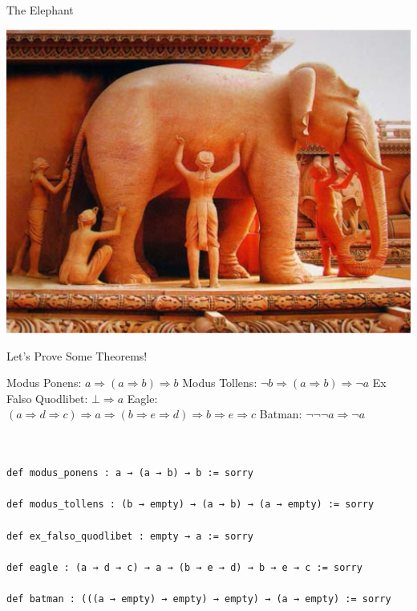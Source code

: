 \documentclass[pdf]{beamer}
\begin{document}
\begin{frame}{The Elephant}
  \begin{center}
    \includegraphics[scale=0.28]{images/elephant}
  \end{center}
\end{frame}

\begin{frame}[fragile]{Let's Prove Some Theorems!}
  \begin{outline}
    \1 Modus Ponens: $a \Rightarrow (a \Rightarrow b) \Rightarrow b$
    \1 Modus Tollens: $\neg{b} \Rightarrow (a \Rightarrow b) \Rightarrow \neg{a}$
    \1 Ex Falso Quodlibet: $\bot \Rightarrow a$
    \1 Eagle: $(a \Rightarrow d \Rightarrow c) \Rightarrow a \Rightarrow (b \Rightarrow e \Rightarrow d) \Rightarrow b \Rightarrow e \Rightarrow c$
    \1 Batman: $\neg{\neg{\neg{a}}} \Rightarrow \neg{a}$
    \pause
    \\~\
    \\~\
    \begin{verbatim}
def modus_ponens : a → (a → b) → b := sorry

def modus_tollens : (b → empty) → (a → b) → (a → empty) := sorry

def ex_falso_quodlibet : empty → a := sorry

def eagle : (a → d → c) → a → (b → e → d) → b → e → c := sorry

def batman : (((a → empty) → empty) → empty) → (a → empty) := sorry
    \end{verbatim}
  \end{outline}
\end{frame}
\end{document}
